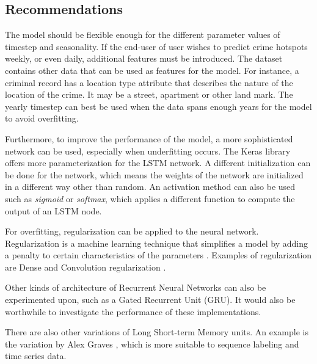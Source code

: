 \subsection{Recommendations}
    The model should be flexible enough for the different parameter values of timestep and seasonality. If the end-user of user wishes to predict crime hotspots weekly, or even daily, additional features must be introduced. The dataset contains other data that can be used as features for the model. For instance, a criminal record has a location type attribute that describes the nature of the location of the crime. It may be a street, apartment or other land mark. The yearly timestep can best be used when the data spans enough years for the model to avoid overfitting.

    Furthermore, to improve the performance of the model, a more sophisticated network can be used, especially when underfitting occurs. The Keras library offers more parameterization for the LSTM network. A different initialization can be done for the network, which means the weights of the network are initialized in a different way other than random. An activation method can also be used such as \textit{sigmoid} or \textit{softmax}, which applies a different function to compute the output of an LSTM node.

    For overfitting, regularization can be applied to the neural network. Regularization is a machine learning technique that simplifies a model by adding a penalty to certain characteristics of the parameters \cite{scikit-learn}. Examples of regularization are Dense and Convolution regularization \cite{chollet2015keras}.

    Other kinds of architecture of Recurrent Neural Networks can also be experimented upon, such as a Gated Recurrent Unit (GRU). It would also be worthwhile to investigate the performance of these implementations.

    There are also other variations of Long Short-term Memory units. An example is the variation by Alex Graves \cite{graves2013generating}, which is more suitable to sequence labeling and time series data.